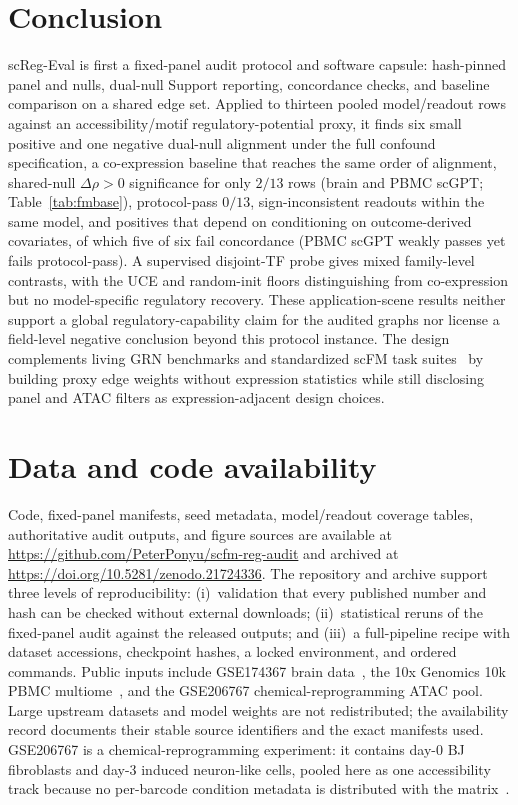 \documentclass[fleqn,10pt,lineno]{wlpeerj}
\begin{document}
\section{Conclusion}
scReg-Eval is first a fixed-panel audit protocol and software capsule: hash-pinned panel and
nulls, dual-null Support reporting, concordance checks, and baseline comparison on a shared edge
set. Applied to thirteen pooled model/readout rows against an accessibility/motif
regulatory-potential proxy, it finds six small positive and one negative dual-null alignment under
the full confound specification, a co-expression baseline that reaches the same order of alignment,
shared-null $\Delta\rho>0$ significance for only $2/13$ rows (brain and PBMC scGPT;
Table~\ref{tab:fmbase}), protocol-pass $0/13$, sign-inconsistent readouts within the same model,
and positives that depend on conditioning on outcome-derived covariates, of which five of six fail
concordance (PBMC scGPT weakly passes yet fails protocol-pass). A supervised disjoint-TF probe
gives mixed family-level contrasts, with the UCE and random-init floors distinguishing from
co-expression but no model-specific regulatory recovery. These application-scene results neither
support a global regulatory-capability claim for the audited graphs nor license a field-level
negative conclusion beyond this protocol instance. The design complements living GRN benchmarks
and standardized scFM task suites~\citep{nourisa2025genernib,qiu2025biollm} by building proxy edge
weights without expression statistics while still disclosing panel and ATAC filters as
expression-adjacent design choices.

\FloatBarrier
\section*{Data and code availability}
Code, fixed-panel manifests, seed metadata, model/readout coverage tables, authoritative audit
outputs, and figure sources are available at
\url{https://github.com/PeterPonyu/scfm-reg-audit} and archived at
\url{https://doi.org/10.5281/zenodo.21724336}. The repository and archive support three levels of
reproducibility: (i)~validation that every published number and hash can be checked without external
downloads; (ii)~statistical reruns of the fixed-panel audit against the released outputs; and
(iii)~a full-pipeline recipe with dataset accessions, checkpoint hashes, a locked environment, and
ordered commands. Public inputs include GSE174367 brain data~\citep{morabito2021gse174367}, the 10x
Genomics 10k PBMC multiome~\citep{tenx_pbmc_multiome}, and the GSE206767 chemical-reprogramming ATAC
pool. Large upstream datasets and model weights are not redistributed; the availability record
documents their stable source identifiers and the exact manifests used. GSE206767 is a
chemical-reprogramming experiment: it contains day-0 BJ fibroblasts and day-3 induced neuron-like
cells, pooled here as one accessibility track because no per-barcode condition metadata is
distributed with the matrix~\citep{gse206767}.
\end{document}
